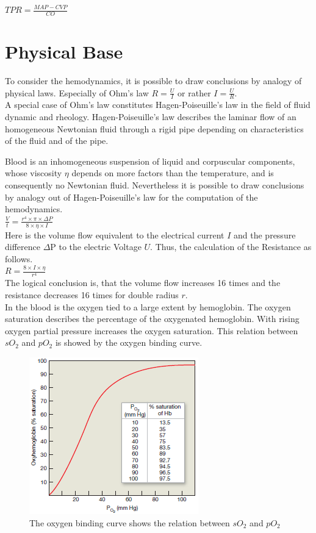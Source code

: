 $ TPR=\frac{MAP-CVP}{CO} $

\section{Physical Base}
To consider the hemodynamics, it is possible to draw conclusions by analogy of physical laws. Especially of Ohm's law $ R=\frac{U}{I} $ or rather $ I=\frac{U}{R} $.\\

A special case of Ohm's law constitutes Hagen-Poiseuille's law in the field of fluid dynamic and rheology. Hagen-Poiseuille's law describes the laminar flow of an homogeneous Newtonian fluid through a rigid pipe depending on characteristics of the fluid and of the pipe.

Blood is an inhomogeneous suspension of liquid and corpuscular components, whose viscosity $ \eta $ depends on more factors than the temperature, and is consequently no Newtonian fluid. Nevertheless it is possible to draw conclusions by analogy out of Hagen-Poiseuille's law for the computation of the hemodynamics.\\

$ \frac{V}{t}=\frac{r^{4}\times\pi\times\Delta P}{8\times\eta\times I} $\\

Here is the volume flow equivalent to the electrical current $ I $ and the pressure difference $ \Delta $P to the electric Voltage $ U $. Thus, the calculation of the Resistance as follows.\\

$ R=\frac{8\times I\times\eta}{r^{4}} $\\

The logical conclusion is, that the volume flow increases 16 times and the resistance decreases 16 times for double radius $ r $.\\

In the blood is the oxygen tied to a large extent by hemoglobin. The oxygen saturation describes the percentage of the oxygenated hemoglobin. With rising oxygen partial pressure increases the oxygen saturation. This relation between $ sO_{2} $ and $ pO_{2} $ is showed by the oxygen binding curve.

\begin{figure}[H]                                         %
	\includegraphics[width=.4\textwidth]{figures/oxygen_saturation_curve}  %
	\caption{The oxygen binding curve shows the relation between $ sO_{2} $ and $ pO_{2} $ }
	\label{fig:FigureLABEL}  %
\end{figure}

